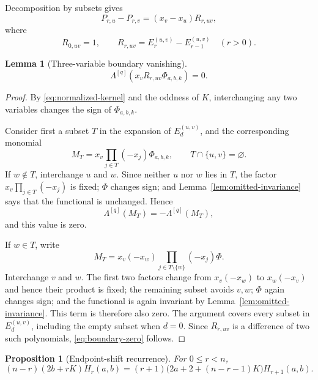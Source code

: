 \documentclass[11pt,a4paper]{article}
\newtheorem{lemma}[theorem]{Lemma}
\newtheorem{proposition}[theorem]{Proposition}
\theoremstyle{definition}
\begin{document}
Decomposition by subsets gives
\begin{equation}\label{eq:P-remainder}
P_{r,u}-P_{r,v}=(x_v-x_u)R_{r,uv},
\end{equation}
where
\[
R_{0,uv}=1,\qquad
R_{r,uv}=E_r^{(u,v)}-E_{r-1}^{(u,v)}\quad(r>0).
\]

\begin{lemma}[Three-variable boundary vanishing]\label{lem:boundary-zero}
\begin{equation}\label{eq:boundary-zero}
\Lambda^{[q]}(x_vR_{r,uv}\Phi_{a,b,k})=0.
\end{equation}
\end{lemma}

\begin{proof}
By \eqref{eq:normalized-kernel} and the oddness of $K$, interchanging
any two variables changes the sign of $\Phi_{a,b,k}$.

Consider first a subset $T$ in the expansion of $E_d^{(u,v)}$, and the
corresponding monomial
\[
M_T=x_v\prod_{j\in T}(-x_j)\Phi_{a,b,k},
\qquad T\cap\{u,v\}=\varnothing.
\]
If $w\notin T$, interchange $u$ and $w$.  Since neither $u$ nor $w$
lies in $T$, the factor $x_v\prod_{j\in T}(-x_j)$ is fixed;
$\Phi$ changes sign; and Lemma~\ref{lem:omitted-invariance} says that
the functional is unchanged.  Hence
\[
\Lambda^{[q]}(M_T)=-\Lambda^{[q]}(M_T),
\]
and this value is zero.

If $w\in T$, write
\[
M_T=x_v(-x_w)\prod_{j\in T\setminus\{w\}}(-x_j)\Phi.
\]
Interchange $v$ and $w$.  The first two factors change from
$x_v(-x_w)$ to $x_w(-x_v)$ and hence their product is fixed; the
remaining subset avoids $v,w$; $\Phi$ again changes sign; and the
functional is again invariant by Lemma~\ref{lem:omitted-invariance}.
This term is therefore also zero.  The argument covers every subset in
$E_d^{(u,v)}$, including the empty subset when $d=0$.  Since
$R_{r,uv}$ is a difference of two such polynomials,
\eqref{eq:boundary-zero} follows.
\end{proof}

\begin{proposition}[Endpoint-shift recurrence]\label{prop:shift-recurrence}
For $0\le r<n$,
\begin{equation}\label{eq:shift-recurrence}
(n-r)(2b+rK)H_r(a,b)
=(r+1)\bigl(2a+2+(n-r-1)K\bigr)H_{r+1}(a,b).
\end{equation}
\end{proposition}
\end{document}

